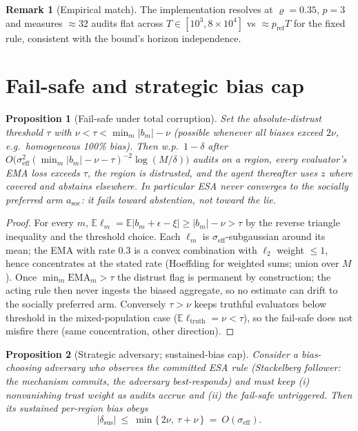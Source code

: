 \documentclass[11pt]{article}
\newtheorem{proposition}{Proposition}
\theoremstyle{definition}\newtheorem{definition}{Definition}
\theoremstyle{definition}\newtheorem{assumption}{Assumption}
\newtheorem{remark}{Remark}
\newcommand{\E}{\mathbb{E}}\newcommand{\Prob}{\mathbb{P}}
\newcommand{\nfl}{\nu}                      %
\begin{document}
\begin{remark}[Empirical match]
The implementation resolves at $\varrho=0.35$, $p=3$ and measures $\approx 32$
audits flat across $T\in[10^3,8\times10^4]$ vs $\approx p_{\mathrm{ref}}T$ for the
fixed rule, consistent with the bound's horizon independence.
\end{remark}

\section{Fail-safe and strategic bias cap}
\label{app:failsafe}

\begin{proposition}[Fail-safe under total corruption]\label{prop:failsafe}
Set the absolute-distrust threshold $\tau$ with
$\nfl<\tau<\min_m|b_m|-\nfl$ (possible whenever all biases exceed $2\nfl$, e.g.\
homogeneous 100\% bias). Then w.p.\ $1-\delta$ after
$O\big(\sigma_{\mathrm{eff}}^{2}(\min_m|b_m|-\nfl-\tau)^{-2}\log(M/\delta)\big)$
audits on a region, every evaluator's EMA loss exceeds $\tau$, the region is
distrusted, and the agent thereafter uses $z$ where covered and abstains
elsewhere. In particular ESA never converges to the socially preferred arm
$a_{\mathrm{soc}}$: it fails toward abstention, not toward the lie.
\end{proposition}

\begin{proof}
For every $m$, $\E\ell_m=\E|b_m+\epsilon-\xi|\ge|b_m|-\nfl>\tau$ by the reverse
triangle inequality and the threshold choice. Each $\ell_m$ is
$\sigma_{\mathrm{eff}}$-subgaussian around its mean; the EMA with rate $0.3$ is a
convex combination with $\ell_2$ weight $\le 1$, hence concentrates at the stated
rate (Hoeffding for weighted sums; union over $M$). Once
$\min_m\mathrm{EMA}_m>\tau$ the distrust flag is permanent by construction; the
acting rule then never ingests the biased aggregate, so no estimate can drift to
the socially preferred arm. Conversely $\tau>\nfl$ keeps truthful evaluators
below threshold in the mixed-population case
($\E\ell_{\mathrm{truth}}=\nfl<\tau$), so the fail-safe does not misfire there
(same concentration, other direction).
\end{proof}

\begin{proposition}[Strategic adversary; sustained-bias cap]\label{prop:stackelberg}
Consider a bias-choosing adversary who observes the committed ESA rule
(Stackelberg follower: the mechanism commits, the adversary best-responds) and
must keep (i) nonvanishing trust weight as audits accrue and (ii) the fail-safe
untriggered. Then its sustained per-region bias obeys
\[
|\delta_{\mathrm{sus}}|\ \le\ \min\{\,2\nfl,\ \tau+\nfl\,\}\ =\ O(\sigma_{\mathrm{eff}}).
\]
\end{proposition}
\end{document}
